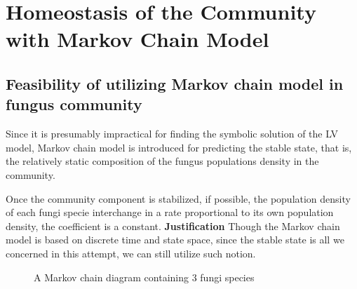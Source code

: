 \section{Homeostasis of the Community with Markov Chain Model}\label{sec:markov}


\subsection{Feasibility of utilizing Markov chain model in fungus community}

Since it is presumably impractical for finding the symbolic solution of the LV model, Markov chain model is introduced for predicting the stable state, that is, the relatively static composition of the fungus populations density in the community.

\begin{definition}
    Once the community component is stabilized, if possible, the population density of each fungi specie interchange in a rate proportional to its own population density, the coefficient is a constant.
    \textbf{Justification} Though the Markov chain model is based on discrete time and state space, since the stable state is all we concerned in this attempt, we can still utilize such notion.
\end{definition}


\begin{figure}\caption{A Markov chain diagram containing 3 fungi species}\label{fig:markov3}
    \begin{center}
    \end{center}
\end{figure}


